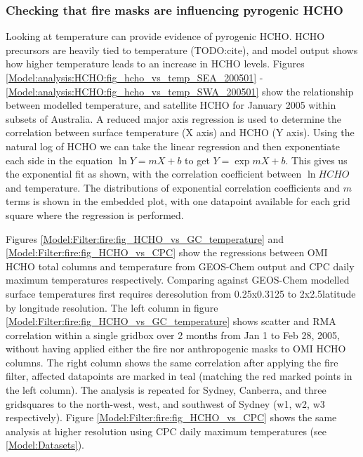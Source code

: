   
    \subsubsection{Checking that fire masks are influencing pyrogenic HCHO}
      
      Looking at temperature can provide evidence of pyrogenic HCHO.
      HCHO precursors are heavily tied to temperature (TODO:cite), and model output shows how higher temperature leads to an increase in HCHO levels.
      Figures \ref{Model:analysis:HCHO:fig_hcho_vs_temp_SEA_200501} - \ref{Model:analysis:HCHO:fig_hcho_vs_temp_SWA_200501} show the relationship between modelled temperature, and satellite HCHO for January 2005 within subsets of Australia.
      A reduced major axis regression is used to determine the correlation between surface temperature (X axis) and HCHO (Y axis).
      Using the natural log of HCHO we can take the linear regression and then exponentiate each side in the equation $\ln{Y} = m{X}+b$ to get ${Y} = \exp{m{X}+b}$. 
      This gives us the exponential fit as shown, with the correlation coefficient between $\ln{HCHO}$ and temperature.
      The distributions of exponential correlation coefficients and $m$ terms is shown in the embedded plot, with one datapoint available for each grid square where the regression is performed.
      
      Figures \ref{Model:Filter:fire:fig_HCHO_vs_GC_temperature} and \ref{Model:Filter:fire:fig_HCHO_vs_CPC} show the regressions between OMI HCHO total columns and temperature from GEOS-Chem output and CPC daily maximum temperatures respectively.
      Comparing against GEOS-Chem modelled surface temperatures first requires deresolution from 0.25x0.3125 to 2x2.5\degr latitude by longitude resolution.
      The left column in figure \ref{Model:Filter:fire:fig_HCHO_vs_GC_temperature} shows scatter and RMA correlation within a single gridbox over 2 months from Jan 1 to Feb 28, 2005, without having applied either the fire nor anthropogenic masks to OMI HCHO columns. 
      The right column shows the same correlation after applying the fire filter, affected datapoints are marked in teal (matching the red marked points in the left column).
      The analysis is repeated for Sydney, Canberra, and three gridsquares to the north-west, west, and southwest of Sydney (w1, w2, w3 respectively).
      Figure \ref{Model:Filter:fire:fig_HCHO_vs_CPC} shows the same analysis at higher resolution using CPC daily maximum temperatures (see \ref{Model:Datasets}).
      
